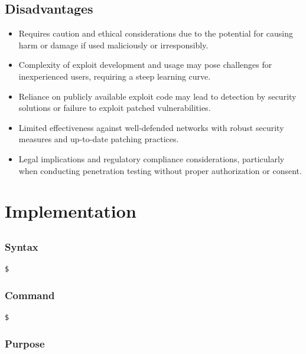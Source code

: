 \documentclass[11pt]{article}
\begin{document}
\subsection{Disadvantages}
\begin{itemize}
    \item Requires caution and ethical considerations due to the potential for causing harm or damage if used maliciously or irresponsibly.
    \item Complexity of exploit development and usage may pose challenges for inexperienced users, requiring a steep learning curve.
    \item Reliance on publicly available exploit code may lead to detection by security solutions or failure to exploit patched vulnerabilities.
    \item Limited effectiveness against well-defended networks with robust security measures and up-to-date patching practices.
    \item Legal implications and regulatory compliance considerations, particularly when conducting penetration testing without proper authorization or consent.
\end{itemize}


\section{Implementation}
\subsection{}

\subsubsection*{Syntax}
\begin{verbatim}
$
\end{verbatim}

\subsubsection*{Command}
\begin{verbatim}
$
\end{verbatim}

\subsubsection*{Purpose}
\end{document}

